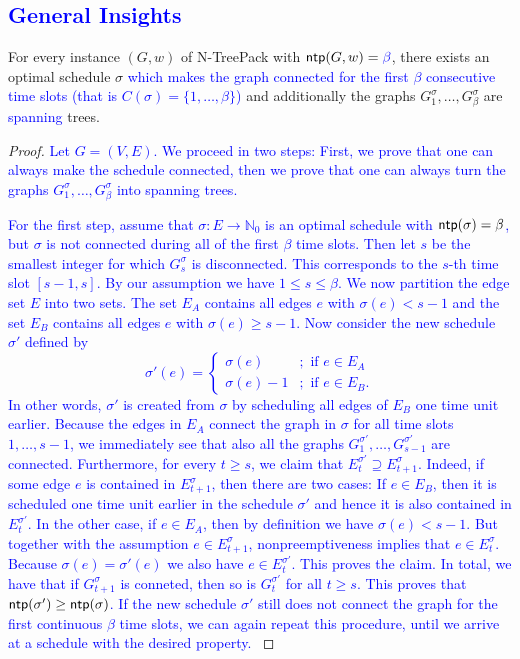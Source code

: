 \documentclass[runningheads]{llncs}
\newcommand{\NN}{\mathbb{N}}
\newcommand{\set}[1]{\{ #1 \}}
\newcommand{\fromto}[2]{\set{#1, \ldots, #2}}
\newcommand{\xxxNTP}{{\sc N-TreePack}}
\DeclareMathOperator{\ntp}{\text{\sf ntp}}
\newcommand{\lasse}[1]{\textcolor{blue}{#1}}
\begin{document}
\subsection{\lasse{General Insights}}

\begin{lemma}
\label{le:structure}
For every instance $(G,w)$ of {\xxxNTP} with $\ntp(G,w)=\lasse{\beta}$, there exists an optimal schedule $\sigma$ 
\lasse{which makes the graph connected for the first $\beta$ consecutive time slots (that is $C(\sigma) = \fromto{1}{\beta}$)} and additionally the graphs $G^\sigma_1,\ldots,G^\sigma_\beta$ are \lasse{spanning} trees.
\end{lemma}

\begin{proof}
\lasse{
Let $G = (V,E)$. We proceed in two steps: First, we prove that one can always make the schedule connected, then we prove that one can always turn the graphs $G^\sigma_1,\ldots,G^\sigma_\beta$ into spanning trees.
}

\lasse{
For the first step, assume that $\sigma : E \rightarrow \NN_0$ is an optimal schedule with $\ntp(\sigma) = \beta$, but $\sigma$ is not connected during all of the first $\beta$ time slots.
 Then let $s$ be the smallest integer for which $G^\sigma_s$ is disconnected.
  This corresponds to the $s$-th time slot $[s-1,s]$. By our assumption we have $1 \leq s \leq \beta$. We now partition the edge set $E$ into two sets. The set $E_A$ contains all edges $e$ with $\sigma(e) < s-1$ and the set $E_B$ contains all edges $e$ with $\sigma(e) \geq s-1$. Now consider the new schedule $\sigma'$ defined by
\[
\sigma'(e) = \begin{cases} \sigma(e) &;\text{ if } e \in E_A\\
\sigma(e) - 1&;\text{ if } e \in E_B.
\end{cases}
\]
In other words, $\sigma'$ is created from $\sigma$ by scheduling all edges of $E_B$ one time unit earlier. 
Because the edges in $E_A$ connect the graph in $\sigma$ for all time slots $1,\ldots,s-1$, we immediately see that also all the graphs $G_1^{\sigma'},\ldots,G^{\sigma'}_{s-1}$ are connected. 
Furthermore, for every $t \geq s$, we claim that $E^{\sigma'}_t \supseteq E^\sigma_{t+1}$. 
Indeed, if some edge $e$ is contained in $E^\sigma_{t+1}$, then there are two cases: 
If $e \in E_B$, then it is scheduled one time unit earlier in the schedule $\sigma'$ and hence it is also contained in $E^{\sigma'}_t$. 
In the other case, if $e \in E_A$, then by definition we have $\sigma(e) < s-1$. 
But together with the assumption $e \in E^\sigma_{t+1}$, nonpreemptiveness implies that $e \in E^\sigma_t$. 
Because $\sigma(e) = \sigma'(e)$ we also have $e \in E^{\sigma'}_t$. This proves the claim. In total, we have that if $G^\sigma_{t+1}$ is conneted, then so is $G^{\sigma'}_{t}$ for all $t \geq s$. This proves that $\ntp(\sigma') \geq \ntp(\sigma)$.
 If the new schedule $\sigma'$ still does not connect the graph for the first continuous $\beta$ time slots, we can again repeat this procedure, until we arrive at a schedule with the desired property.
}


\end{proof}
\end{document}
